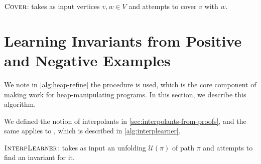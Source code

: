 \begin{algorithm}[ht]


  \caption{$\textsc{Cover}$: takes as input vertices $v, w \in V$ and attempts to cover $v$ with $w$.}
  \label{alg:heap-cover}
\end{algorithm}

\section{Learning Invariants from Positive and Negative Examples}

We note in \autoref{alg:heap-refine} the procedure \seplearner is used, which is the core component of making \impact work for heap-manipulating programs. In this section, we describe this algorithm.

We defined the notion of interpolants in \autoref{sec:interpolants-from-proofs}, and the same applies to \seplearner, which is described in \autoref{alg:interplearner}.

\begin{algorithm}[ht]


  \caption{$\textsc{InterpLearner}$: takes as input an unfolding $\mathcal{U}(\pi)$ of path $\pi$ and attempts to find an invariant for it.}
  \label{alg:interplearner}
\end{algorithm}

